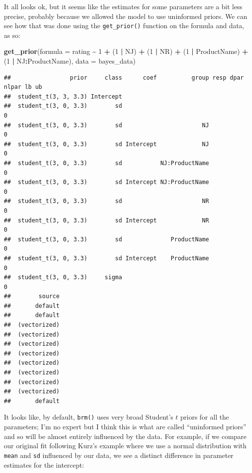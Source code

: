 \documentclass[
]{book}
\newenvironment{Shaded}{\begin{snugshade}}{\end{snugshade}}
\newcommand{\AttributeTok}[1]{\textcolor[rgb]{0.13,0.29,0.53}{#1}}
\newcommand{\DecValTok}[1]{\textcolor[rgb]{0.00,0.00,0.81}{#1}}
\newcommand{\FunctionTok}[1]{\textcolor[rgb]{0.13,0.29,0.53}{\textbf{#1}}}
\newcommand{\NormalTok}[1]{#1}
\newcommand{\SpecialCharTok}[1]{\textcolor[rgb]{0.81,0.36,0.00}{\textbf{#1}}}
\begin{document}
It all looks ok, but it seems like the estimates for some parameters are a bit less precise, probably because we allowed the model to use uninformed priors. We can see how that was done using the \texttt{get\_prior()} function on the formula and data, as so:

\begin{Shaded}
\begin{Highlighting}[]
\FunctionTok{get\_prior}\NormalTok{(}\AttributeTok{formula =}\NormalTok{ rating }\SpecialCharTok{\textasciitilde{}} \DecValTok{1} \SpecialCharTok{+}\NormalTok{ (}\DecValTok{1} \SpecialCharTok{|}\NormalTok{ NJ) }\SpecialCharTok{+}\NormalTok{ (}\DecValTok{1} \SpecialCharTok{|}\NormalTok{ NR) }\SpecialCharTok{+}\NormalTok{ (}\DecValTok{1} \SpecialCharTok{|}\NormalTok{ ProductName) }\SpecialCharTok{+}\NormalTok{ (}\DecValTok{1} \SpecialCharTok{|}\NormalTok{ NJ}\SpecialCharTok{:}\NormalTok{ProductName),}
          \AttributeTok{data =}\NormalTok{ bayes\_data)}
\end{Highlighting}
\end{Shaded}

\begin{verbatim}
##                 prior     class      coef          group resp dpar nlpar lb ub
##  student_t(3, 3, 3.3) Intercept                                               
##  student_t(3, 0, 3.3)        sd                                           0   
##  student_t(3, 0, 3.3)        sd                       NJ                  0   
##  student_t(3, 0, 3.3)        sd Intercept             NJ                  0   
##  student_t(3, 0, 3.3)        sd           NJ:ProductName                  0   
##  student_t(3, 0, 3.3)        sd Intercept NJ:ProductName                  0   
##  student_t(3, 0, 3.3)        sd                       NR                  0   
##  student_t(3, 0, 3.3)        sd Intercept             NR                  0   
##  student_t(3, 0, 3.3)        sd              ProductName                  0   
##  student_t(3, 0, 3.3)        sd Intercept    ProductName                  0   
##  student_t(3, 0, 3.3)     sigma                                           0   
##        source
##       default
##       default
##  (vectorized)
##  (vectorized)
##  (vectorized)
##  (vectorized)
##  (vectorized)
##  (vectorized)
##  (vectorized)
##  (vectorized)
##       default
\end{verbatim}

It looks like, by default, \texttt{brm()} uses very broad Student's \(t\) priors for all the parameters; I'm no expert but I think this is what are called ``uninformed priors'' and so will be almost entirely influenced by the data. For example, if we compare our original fit following Kurz's example where we use a normal distribution with \texttt{mean} and \texttt{sd} influenced by our data, we see a distinct difference in parameter estimates for the intercept:
\end{document}
